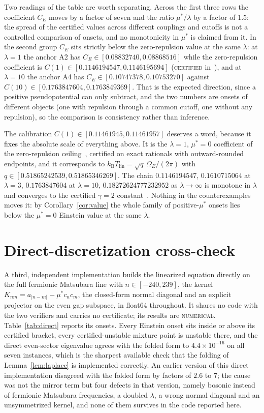 \documentclass[11pt]{article}
\newcommand{\kb}{k_{\mathrm B}}
\newcommand{\Tlin}{T_{\mathrm{lin}}}
\newcommand{\OmE}{\Omega_E}
\newcommand{\muS}{\mu^{*}}
\theoremstyle{definition}
\theoremstyle{remark}
\begin{document}
Two readings of the table are worth separating. Across the first three rows the coefficient
$C_E$ moves by a factor of seven and the ratio $\muS/\lambda$ by a factor of $1.5$: the
spread of the certified values across different couplings and cutoffs is not a controlled
comparison of onsets, and no monotonicity in $\muS$ is claimed from it. In the second group
$C_E$ sits strictly below the zero-repulsion value at the same $\lambda$: at $\lambda=1$
the anchor A2 has $C_E\in[0.08832740,0.08868516]$ while the zero-repulsion coefficient is
$C(1)\in[0.1146194547,0.1146195694]$ (\textsc{certified} in~\cite{finiteband,univglue}),
and at $\lambda=10$ the anchor A4 has $C_E\in[0.10747378,0.10753270]$ against
$C(10)\in[0.1763847604,0.1763849369]$. That is the expected direction, since a positive
pseudopotential can only subtract, and the two numbers are onsets of different objects (one
with repulsion through a common cutoff, one without any repulsion), so the comparison is
consistency rather than inference.

The calibration $C(1)\in[0.11461945,0.11461957]$ deserves a word, because it fixes the
absolute scale of everything above. It is the $\lambda=1$, $\muS=0$ coefficient of the
zero-repulsion ceiling~\cite{finiteband,univglue}, certified on exact rationals with
outward-rounded endpoints, and it corresponds to $\kb\Tlin=\sqrt{q}\,\OmE/(2\pi)$ with
$q\in[0.51865242539,0.51865346269]$. The chain $0.1146194547$, $0.1610715064$ at
$\lambda=3$, $0.1763847604$ at $\lambda=10$, $0.18272624777232952$ as
$\lambda\to\infty$ is monotone in $\lambda$ and converges to the certified $\gamma=2$
constant~\cite{gamma}. Nothing in the counterexamples moves it: by
Corollary~\ref{cor:value} the whole family of positive-$\muS$ onsets lies below the
$\muS=0$ Einstein value at the same $\lambda$.

\section{Direct-discretization cross-check}\label{sec:num}

A third, independent implementation builds the linearized equation directly on the full
fermionic Matsubara line with $n\in[-240,239]$, the kernel
$K_{nm}=a_{|n-m|}-\muS c_nc_m$, the closed-form normal diagonal and an explicit projector on
the even gap subspace, in float64 throughout. It shares no code with the two verifiers and
carries no certificate; its results are \textsc{numerical}. Table~\ref{tab:direct} reports
its onsets. Every Einstein onset sits inside or above its certified bracket, every
certified-unstable mixture point is unstable there, and the direct even-sector eigenvalue
agrees with the folded form to $4.4\times10^{-16}$ on all seven instances, which is the
sharpest available check that the folding of Lemma~\ref{lem:laplace} is implemented
correctly. An earlier version of this direct implementation disagreed with the folded
form by factors of $2.6$ to $7$; the cause was not the mirror term but four defects in
that version, namely bosonic instead of fermionic Matsubara frequencies, a doubled
$\lambda$, a wrong normal diagonal and an unsymmetrized kernel, and none of them survives
in the code reported here.
\end{document}
